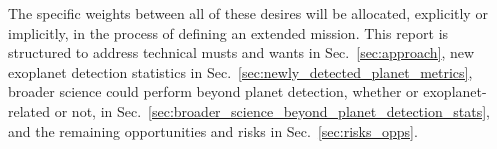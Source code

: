 The specific weights between all of these desires will be allocated, explicitly or implicitly, in the process of defining an extended mission.
This report is structured to address technical musts and wants in Sec.~\ref{sec:approach}, new exoplanet detection statistics in Sec.~\ref{sec:newly_detected_planet_metrics}, broader science \tess could perform beyond planet detection, whether or exoplanet-related or not, in Sec.~\ref{sec:broader_science_beyond_planet_detection_stats}, and the remaining opportunities and risks in Sec.~\ref{sec:risks_opps}.
